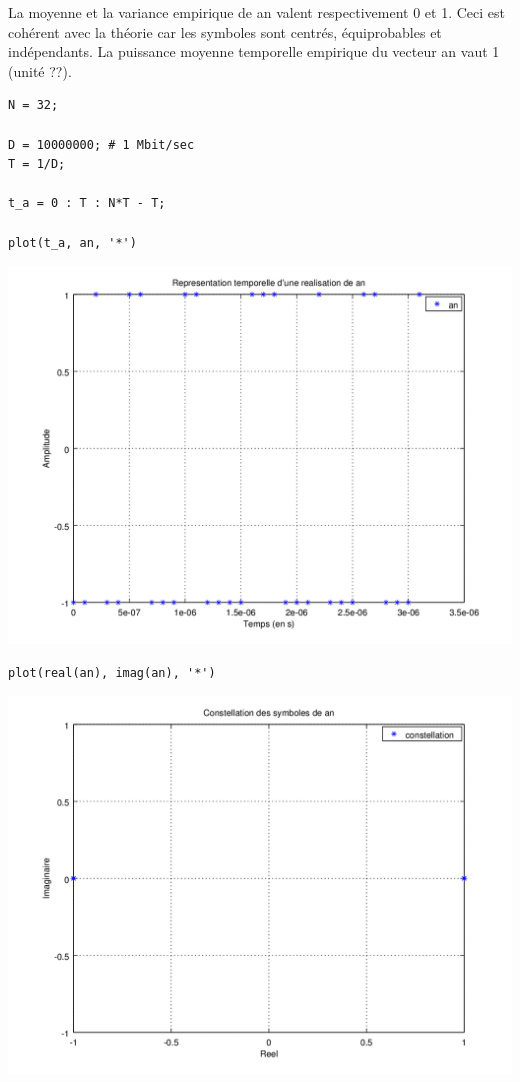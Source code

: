 \documentclass{acm_proc_article-sp}
\begin{document}
La moyenne et la variance empirique de an valent respectivement 0 et 1. Ceci est cohérent avec la théorie car les symboles sont centrés, équiprobables et indépendants.
La puissance moyenne temporelle empirique du vecteur an vaut 1 (unité ??).

\begin{center}
\begin{lstlisting}
N = 32;

D = 10000000; # 1 Mbit/sec
T = 1/D;

t_a = 0 : T : N*T - T;

plot(t_a, an, '*')
\end{lstlisting}

\includegraphics[scale=0.45]{ak_2.png}

\begin{lstlisting}
plot(real(an), imag(an), '*')
\end{lstlisting}

\includegraphics[scale=0.45]{constell_2.png}
\end{center}
\end{document}
